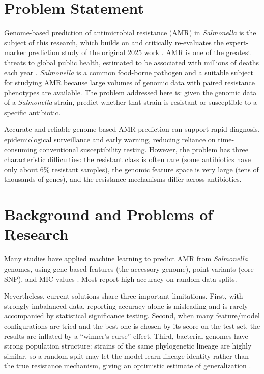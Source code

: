 \documentclass[../main.tex]{subfiles}
\begin{document}
\section{Problem Statement}
\label{sec:problem}

Genome-based prediction of antimicrobial resistance (\gls{AMR}) in \textit{Salmonella} is the subject of this research, which builds on and critically re-evaluates the expert-marker prediction study of the original 2025 work \cite{baseline2025}. \gls{AMR} is one of the greatest threats to global public health, estimated to be associated with millions of deaths each year \cite{murray2022global}. \textit{Salmonella} is a common food-borne pathogen and a suitable subject for studying AMR because large volumes of genomic data with paired resistance phenotypes are available. The problem addressed here is: given the genomic data of a \textit{Salmonella} strain, predict whether that strain is resistant or susceptible to a specific antibiotic.

Accurate and reliable genome-based AMR prediction can support rapid diagnosis, epidemiological surveillance and early warning, reducing reliance on time-consuming conventional susceptibility testing. However, the problem has three characteristic difficulties: the resistant class is often rare (some antibiotics have only about 6\% resistant samples), the genomic feature space is very large (tens of thousands of genes), and the resistance mechanisms differ across antibiotics.

\section{Background and Problems of Research}
\label{sec:background}

Many studies have applied machine learning to predict AMR from \textit{Salmonella} genomes, using gene-based features (the accessory genome), point variants (core \gls{SNP}), and \gls{MIC} values \cite{nguyen2019using}. Most report high accuracy on random data splits.

Nevertheless, current solutions share three important limitations. First, with strongly imbalanced data, reporting accuracy alone is misleading and is rarely accompanied by statistical significance testing. Second, when many feature/model configurations are tried and the best one is chosen by its score on the test set, the results are inflated by a ``winner's curse'' effect. Third, bacterial genomes have strong population structure: strains of the same phylogenetic lineage are highly similar, so a random split may let the model learn lineage identity rather than the true resistance mechanism, giving an optimistic estimate of generalization \cite{earle2016identifying}.
\end{document}
